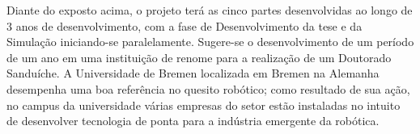 \noindent Diante do exposto acima, o projeto terá as cinco partes desenvolvidas ao longo de 3 anos de desenvolvimento, com a fase de Desenvolvimento da tese e da Simulação iniciando-se paralelamente. Sugere-se o desenvolvimento de um período de um ano em uma instituição de renome para a realização de um Doutorado Sanduíche. A Universidade de Bremen localizada em Bremen na Alemanha desempenha uma boa referência no quesito robótico; como resultado de sua ação, no campus da universidade várias empresas do setor estão instaladas no intuito de desenvolver tecnologia de ponta para a indústria emergente da robótica.



